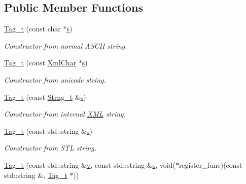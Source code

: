 \subsection*{Public Member Functions}
\begin{DoxyCompactItemize}
\item 
\hyperlink{class_d_d4hep_1_1_x_m_l_1_1_tag__t_aa7b0da20ca009a5fb665c79ea660fbc3}{Tag\_\-t} (const char $\ast$\hyperlink{_volumes_8cpp_a17ca6bfc8040d695d3cada22a4763d40}{s})
\begin{DoxyCompactList}\small\item\em Constructor from normal ASCII string. \item\end{DoxyCompactList}\item 
\hyperlink{class_d_d4hep_1_1_x_m_l_1_1_tag__t_a1a301039b9be52aacf1927975c135131}{Tag\_\-t} (const \hyperlink{namespace_d_d4hep_1_1_x_m_l_a09e5d9cc86ed782f6826dfe0778c1815}{XmlChar} $\ast$\hyperlink{_volumes_8cpp_a17ca6bfc8040d695d3cada22a4763d40}{s})
\begin{DoxyCompactList}\small\item\em Constructor from unicode string. \item\end{DoxyCompactList}\item 
\hyperlink{class_d_d4hep_1_1_x_m_l_1_1_tag__t_a9c6f70c4676068b78dd2d4e594d85162}{Tag\_\-t} (const \hyperlink{class_d_d4hep_1_1_x_m_l_1_1_strng__t}{Strng\_\-t} \&\hyperlink{_volumes_8cpp_a17ca6bfc8040d695d3cada22a4763d40}{s})
\begin{DoxyCompactList}\small\item\em Constructor from internal \hyperlink{namespace_d_d4hep_1_1_x_m_l}{XML} string. \item\end{DoxyCompactList}\item 
\hyperlink{class_d_d4hep_1_1_x_m_l_1_1_tag__t_a1b57625b6abcc2e563bf55b5e69f5877}{Tag\_\-t} (const std::string \&\hyperlink{_volumes_8cpp_a17ca6bfc8040d695d3cada22a4763d40}{s})
\begin{DoxyCompactList}\small\item\em Constructor from STL string. \item\end{DoxyCompactList}\item 
\hyperlink{class_d_d4hep_1_1_x_m_l_1_1_tag__t_a852d3feade27fadfa267798e8e417b80}{Tag\_\-t} (const std::string \&\hyperlink{_multi_view_8cpp_a8320ee13ac034dbf6d624fe8953dd337}{v}, const std::string \&\hyperlink{_volumes_8cpp_a17ca6bfc8040d695d3cada22a4763d40}{s}, void($\ast$register\_\-func)(const std::string \&, \hyperlink{class_d_d4hep_1_1_x_m_l_1_1_tag__t}{Tag\_\-t} $\ast$))

\end{DoxyCompactItemize}
